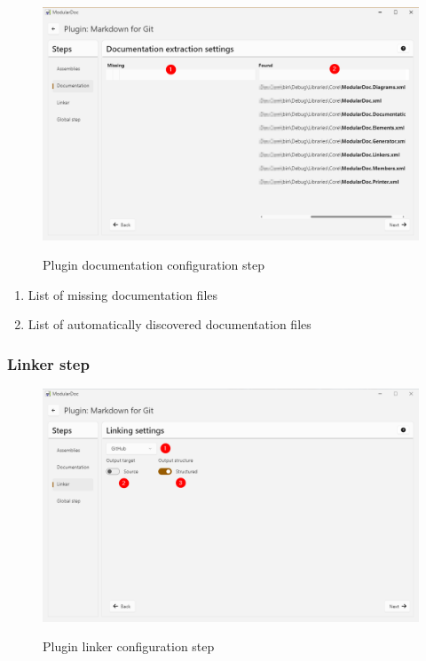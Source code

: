 \begin{figure}[H]
    \includegraphics[width=\linewidth]{img/modularDocDocumentation.png}
    \label{fig:modularDocumentation}
    \caption{Plugin documentation configuration step}
\end{figure}

\begin{enumerate}
    \item List of missing documentation files
    \item List of automatically discovered documentation files
\end{enumerate}

\subsubsection{Linker step}

\begin{figure}[H]
    \includegraphics[width=\linewidth]{img/modularDocLinker.png}
    \label{fig:modularLinker}
    \caption{Plugin linker configuration step}
\end{figure}

